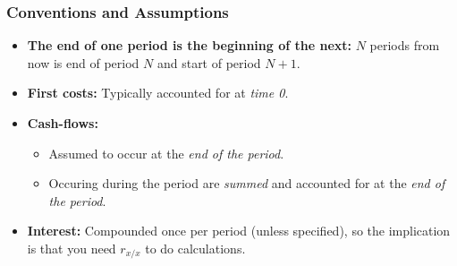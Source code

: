     \subsubsection{Conventions and Assumptions}
    \begin{warning}
        \begin{itemize}
            \item \textbf{The end of one period is the beginning of the next:} $N$ periods from now is end of period $N$ and start of period $N+1$.
            \item \textbf{First costs:} Typically accounted for at \emph{time 0}.
            \item \textbf{Cash-flows:} 
            \begin{itemize}
                \item Assumed to occur at the \emph{end of the period}.
                \item Occuring during the period are \emph{summed} and accounted for at the \emph{end of the period}.
            \end{itemize}
            \item \textbf{Interest:} Compounded once per period (unless specified), so the implication is that you need $r_{x/x}$ to do calculations.
        \end{itemize}
    \end{warning}

